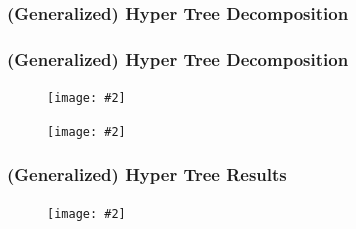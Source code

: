 \documentclass{beamer}
\newcommand{\pic}[2][100]{
	\begin{figure}
		\centering
		\texttt{[image: \#2]}
	\end{figure}
}
\newcommand{\picframe}[3][100]{
	\begin{frame}
		\frametitle{#2}
		\pic[#1]{#3}
	\end{frame}
}
\begin{document}
	\begin{frame}
		\frametitle{(Generalized) Hyper Tree Decomposition}
		\vspace{-1ex}
		\begin{figure}
			\centering
		\end{figure}
		\vspace{-3ex}
		\begin{figure}
			\centering
		\end{figure}
		\vspace{-3ex}
		\begin{figure}
			\centering
		\end{figure}
		\vspace{-2ex}
	\end{frame}
	\begin{frame}
		\frametitle{(Generalized) Hyper Tree Decomposition}
		\pic[60]{pics/ghw}
		\vspace{-2ex}
		\pic[60]{pics/hww}
	\end{frame}
	\picframe{(Generalized) Hyper Tree Results}{pics/hwresult}
\end{document}
